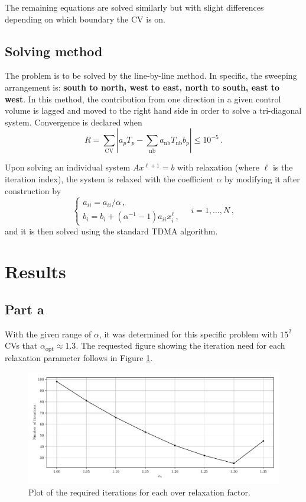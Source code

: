 \documentclass{article}
\begin{document}
The remaining equations are solved similarly but with slight differences depending on which boundary the CV is on.

\subsection*{Solving method}

The problem is to be solved by the line-by-line method. In specific, the sweeping arrangement is: \textbf{south to north, west to east, north to south, east to west}. In this method, the contribution from one direction in a given control volume is lagged and moved to the right hand side in order to solve a tri-diagonal system. Convergence is declared when
\begin{equation}
	R = \sum_\text{CV} \left| a_p T_p - \sum_{\text{nb}} a_\text{nb} T_\text{nb} b_p\right|\leq 10^{-5}\,.
\end{equation}

Upon solving an individual system $Ax^{\ell + 1} = b$ with relaxation (where $\ell$ is the iteration index), the system is relaxed with the coefficient $\alpha$ by modifying it after construction by
\[
	\begin{cases}
		a_{ii} = a_{ii} / \alpha\,,\\
		b_i = b_i + (\alpha^{-1} - 1) a_{ii} x_i^\ell\,,
	\end{cases} \quad i = 1, \ldots, N\,,
\]
and it is then solved using the standard TDMA algorithm.

\section*{Results}

\subsection*{Part a}

With the given range of $\alpha$, it was determined for this specific problem with $15^2$ CVs that $\alpha_\text{opt} \approx 1.3$. The requested figure showing the iteration need for each relaxation parameter follows in Figure \ref{fig:iterations}.

\begin{figure}[H]
	\centering
	\includegraphics[width=\linewidth]{../python/iterations}
	\caption{Plot of the required iterations for each over relaxation factor.}
	\label{fig:iterations}
\end{figure}
\end{document}
